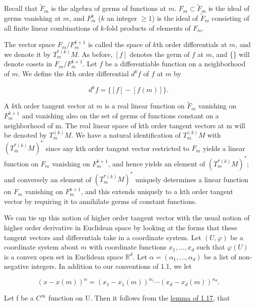 Recall that $\tilde{F}_{m}$ is the algebra of germs of functions at $m$. $F_{m} \subset \tilde{F}_{m}$ is the ideal of germs vanishing at $m$, and $F_{m}^{k}$ ($k$ an integer $\geq 1$) is the ideal of $\tilde{F}_{m}$ consisting of all finite linear combinations of $k$-fold products of elements of $F_{m}$.

The vector space $F_m/F_m^{k+1}$ is called the space of $k$th order differentials at $m$, and we denote it by $T_{m}^{*(k)} M$. As before, $[f]$ denotes the germ of $f$ at $m$, and \{\} will denote cosets in $F_m/F_m^{k+1}$. Let $f$ be a differentiable function on a neighborhood of $m$. We define the $k$th order differential $d^k f$ of $f$ at $m$ by

\begin{equation}
	\tag{1}\label{eq:1.26:1}
	d^{k}f=\{[f]-[f(m)]\}.
\end{equation}

A $k$th order tangent vector at $m$ is a real linear function on $\tilde{F}_{m}$ vanishing on $F_{m}^{k+1}$ and vanishing also on the set of germs of functions constant on a neighborhood of m. The real linear space of kth order tangent vectors at m will be denoted by  $ T_{m}^{(k)} M $. We have a natural identification of  $ T_{m}^{(k)} M $ with  $ (T_{m}^{*(k)} M)^{*} $ since any kth order tangent vector restricted to  $ F_{m} $ yields a linear function on  $ F_{m} $ vanishing on  $ F_{m}^{k+1} $, and hence yields an element of  $ (T_{m}^{*(k)} M)^{*} $; and conversely an element of  $ (T_{m}^{*(k)} M)^{*} $ uniquely determines a linear function on  $ F_{m} $ vanishing on  $ F_{m}^{k+1} $, and this extends uniquely to a kth order tangent vector by requiring it to annihilate germs of constant functions.

We can tie up this notion of higher order tangent vector with the usual notion of higher order derivative in Euclidean space by looking at the forms that these tangent vectors and differentials take in a coordinate system. Let  $ (U,\varphi) $ be a coordinate system about  $ m $ with coordinate functions  $ x_1, \ldots, x_d $ such that  $ \varphi(U) $ is a convex open set in Euclidean space  $ \mathbb{R}^d $. Let  $ \alpha = (\alpha_1, \ldots, \alpha_d) $ be a list of non-negative integers. In addition to our conventions of 1.1, we let

\[
	(x-x(m))^{\alpha}=(x_{1}-x_{1}(m))^{\alpha_{1}}\cdots(x_{d}-x_{d}(m))^{\alpha_{d}}.
\]

Let f be a  $ C^{\infty} $ function on U. Then it follows from the \hyperref[thm:1.17]{lemma of 1.17}, that

